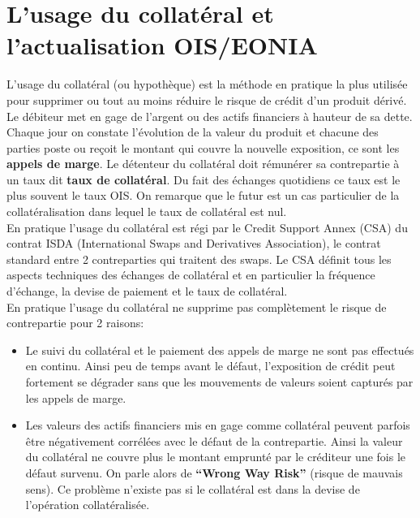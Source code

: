\documentclass{article}
\begin{document}
\section*{L’usage du collatéral et l’actualisation OIS/EONIA}

L’usage du collatéral (ou hypothèque) est la méthode en pratique la plus utilisée pour supprimer ou tout au moins réduire le risque de crédit d'un produit dérivé. Le débiteur met en gage de l’argent ou des actifs financiers à hauteur de sa dette. Chaque jour on constate l’évolution de la valeur du produit et chacune des parties poste ou reçoit le montant qui couvre la nouvelle exposition, ce sont les \textbf{appels de marge}. Le détenteur du collatéral doit rémunérer sa contrepartie à un taux dit \textbf{taux de collatéral}. Du fait des échanges quotidiens ce taux est le plus souvent le taux OIS. On remarque que le futur est un cas particulier de la collatéralisation dans lequel le taux de collatéral est nul.\\

En pratique l’usage du collatéral est régi par le Credit Support Annex (CSA) du contrat ISDA (International Swaps and Derivatives Association), le contrat standard entre 2 contreparties qui traitent des swaps. Le CSA définit tous les aspects techniques des échanges de collatéral et en particulier la fréquence d'échange, la devise de paiement et le taux de collatéral.\\

En pratique l’usage du collatéral ne supprime pas complètement le risque de contrepartie pour 2 raisons:
\begin{itemize}

\item Le suivi du collatéral et le paiement des appels de marge ne sont pas effectués en continu. Ainsi peu de temps avant le défaut, l’exposition de crédit peut fortement se dégrader sans que les mouvements de valeurs soient capturés par les appels de marge.\\

\item Les valeurs des actifs financiers mis en gage comme collatéral peuvent parfois être négativement corrélées avec le défaut de la contrepartie. Ainsi la valeur du collatéral ne couvre plus le montant emprunté par le créditeur une fois le défaut survenu. On parle alors de \textbf{“Wrong Way Risk”} (risque de mauvais sens). Ce problème n’existe pas si le collatéral est dans la devise de l’opération collatéralisée.\\

\end{itemize}
\end{document}
